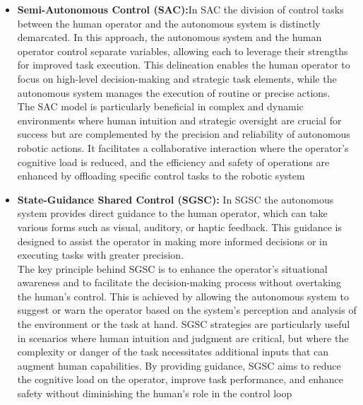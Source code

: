 \begin{itemize}
    \item\textbf{Semi-Autonomous Control (SAC):}In SAC the division of control tasks between the human operator and the autonomous system is distinctly demarcated. In this approach, the autonomous system and the human operator control separate variables, allowing each to leverage their strengths for improved task execution. This delineation enables the human operator to focus on high-level decision-making and strategic task elements, while the autonomous system manages the execution of routine or precise actions.\\ 
    The SAC model is particularly beneficial in complex and dynamic environments where human intuition and strategic oversight are crucial for success but are complemented by the precision and reliability of autonomous robotic actions. It facilitates a collaborative interaction where the operator's cognitive load is reduced, and the efficiency and safety of operations are enhanced by offloading specific control tasks to the robotic system

    \item\textbf{State-Guidance Shared Control (SGSC):} In SGSC the autonomous system provides direct guidance to the human operator, which can take various forms such as visual, auditory, or haptic feedback. This guidance is designed to assist the operator in making more informed decisions or in executing tasks with greater precision.\\ 
    The key principle behind SGSC is to enhance the operator's situational awareness and to facilitate the decision-making process without overtaking the human's control. This is achieved by allowing the autonomous system to suggest or warn the operator based on the system's perception and analysis of the environment or the task at hand. SGSC strategies are particularly useful in scenarios where human intuition and judgment are critical, but where the complexity or danger of the task necessitates additional inputs that can augment human capabilities. By providing guidance, SGSC aims to reduce the cognitive load on the operator, improve task performance, and enhance safety without diminishing the human's role in the control loop


\end{itemize}

